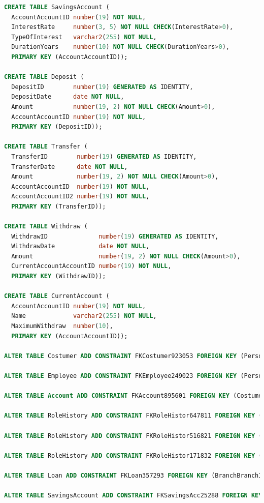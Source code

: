\documentclass[a4paper, 10pt]{article}
\begin{document}
\begin{lstlisting}[language=SQL]
CREATE TABLE SavingsAccount (
  AccountAccountID number(19) NOT NULL, 
  InterestRate     number(3, 5) NOT NULL CHECK(InterestRate>0), 
  TypeOfInterest   varchar2(255) NOT NULL, 
  DurationYears    number(10) NOT NULL CHECK(DurationYears>0), 
  PRIMARY KEY (AccountAccountID));

CREATE TABLE Deposit (
  DepositID        number(19) GENERATED AS IDENTITY, 
  DepositDate      date NOT NULL, 
  Amount           number(19, 2) NOT NULL CHECK(Amount>0), 
  AccountAccountID number(19) NOT NULL, 
  PRIMARY KEY (DepositID));

CREATE TABLE Transfer (
  TransferID        number(19) GENERATED AS IDENTITY, 
  TransferDate      date NOT NULL, 
  Amount            number(19, 2) NOT NULL CHECK(Amount>0), 
  AccountAccountID  number(19) NOT NULL, 
  AccountAccountID2 number(19) NOT NULL, 
  PRIMARY KEY (TransferID));

CREATE TABLE Withdraw (
  WithdrawID              number(19) GENERATED AS IDENTITY, 
  WithdrawDate            date NOT NULL, 
  Amount                  number(19, 2) NOT NULL CHECK(Amount>0), 
  CurrentAccountAccountID number(19) NOT NULL, 
  PRIMARY KEY (WithdrawID));

CREATE TABLE CurrentAccount (
  AccountAccountID number(19) NOT NULL, 
  Name             varchar2(255) NOT NULL, 
  MaximumWithdraw  number(10), 
  PRIMARY KEY (AccountAccountID));

ALTER TABLE Costumer ADD CONSTRAINT FKCostumer923053 FOREIGN KEY (PersonGovID) REFERENCES Person (GovID);

ALTER TABLE Employee ADD CONSTRAINT FKEmployee249023 FOREIGN KEY (PersonGovID) REFERENCES Person (GovID);

ALTER TABLE Account ADD CONSTRAINT FKAccount895601 FOREIGN KEY (CostumerCostumerID) REFERENCES Costumer (CostumerID);

ALTER TABLE RoleHistory ADD CONSTRAINT FKRoleHistor647811 FOREIGN KEY (RoleRoleID) REFERENCES Role (RoleID);

ALTER TABLE RoleHistory ADD CONSTRAINT FKRoleHistor516821 FOREIGN KEY (EmployeeEmployeeID) REFERENCES Employee (EmployeeID);

ALTER TABLE RoleHistory ADD CONSTRAINT FKRoleHistor171832 FOREIGN KEY (BranchBranchId) REFERENCES Branch (BranchId);

ALTER TABLE Loan ADD CONSTRAINT FKLoan357293 FOREIGN KEY (BranchBranchId) REFERENCES Branch (BranchId);

ALTER TABLE SavingsAccount ADD CONSTRAINT FKSavingsAcc25288 FOREIGN KEY (AccountAccountID) REFERENCES Account (AccountID);


\end{lstlisting}
\end{document}
